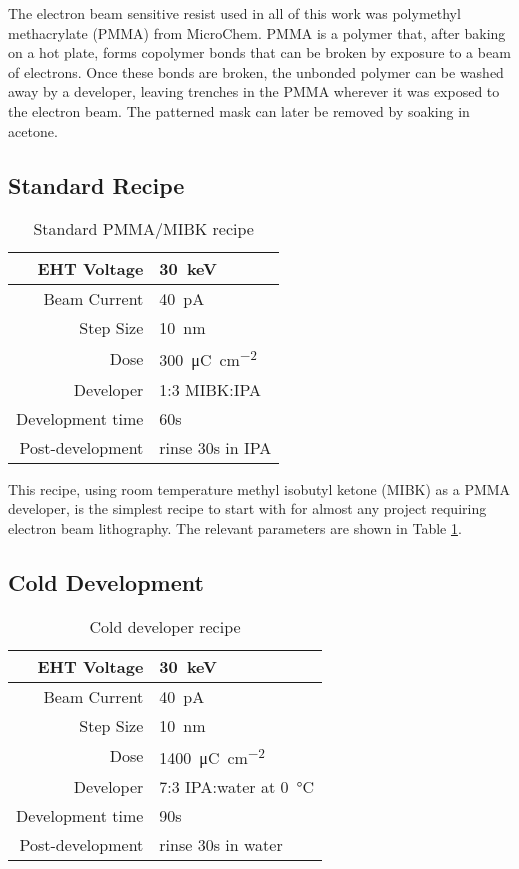 The electron beam sensitive resist used in all of this work was polymethyl methacrylate (PMMA) from MicroChem. PMMA is a polymer that, after baking on a hot plate, forms copolymer bonds that can be broken by exposure to a beam of electrons. Once these bonds are broken, the unbonded polymer can be washed away by a developer, leaving trenches in the PMMA wherever it was exposed to the electron beam. The patterned mask can later be removed by soaking in acetone.

\subsection{Standard Recipe}

\begin{table}
	\centering
	\caption{Standard PMMA/MIBK recipe}
    \begin{tabular}{ r | l }
    	\hline
    	EHT Voltage & \SI{30}{\kilo\electronvolt} \\ \hline
    	Beam Current & \SI{40}{\pico\ampere} \\ \hline
    	Step Size & \SI{10}{\nano\meter} \\ \hline
    	Dose & \SI{300}{\micro\coulomb\per\square\centi\meter} \\ \hline
    	Developer & 1:3 MIBK:IPA \\ \hline
    	Development time & 60s \\ \hline
    	Post-development & rinse 30s in IPA \\ \hline
    \end{tabular}
    \label{table:standard_pmma}
\end{table}

This recipe, using room temperature methyl isobutyl ketone (MIBK) as a PMMA developer, is the simplest recipe to start with for almost any project requiring electron beam lithography. The relevant parameters are shown in Table \ref{table:standard_pmma}.

\subsection{Cold Development}

\begin{table}
	\centering
	\caption{Cold developer recipe}
    \begin{tabular}{ r | l }
    	\hline
    	EHT Voltage & \SI{30}{\kilo\electronvolt} \\ \hline
    	Beam Current & \SI{40}{\pico\ampere} \\ \hline
    	Step Size & \SI{10}{\nano\meter} \\ \hline
    	Dose & \SI{1400}{\micro\coulomb\per\square\centi\meter} \\ \hline
    	Developer & 7:3 IPA:water at \SI{0}{\degreeCelsius} \\ \hline
    	Development time & 90s \\ \hline
    	Post-development & rinse 30s in water \\ \hline
    \end{tabular}
    \label{table:cold_pmma}
\end{table}

